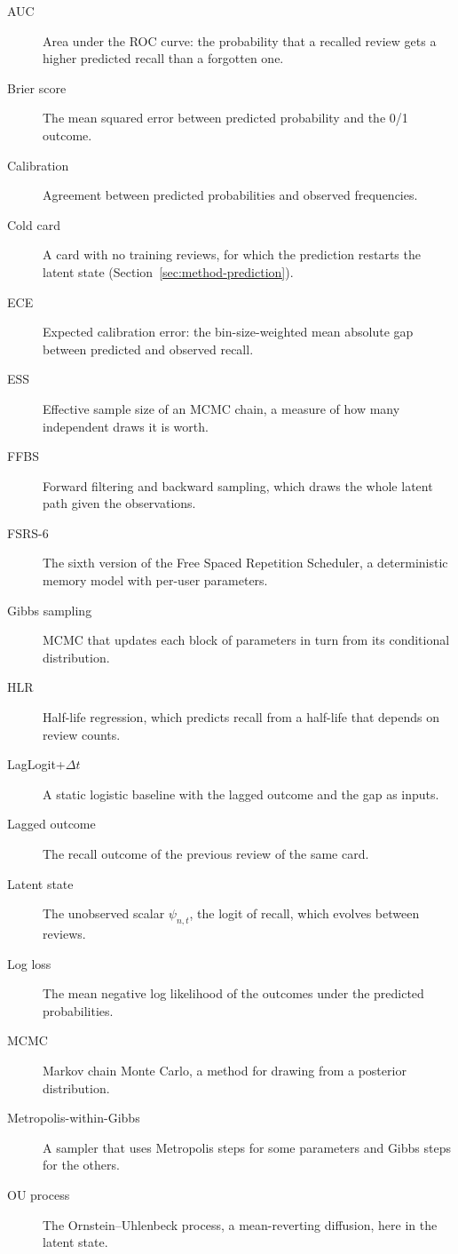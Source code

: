\begin{description}
  \item[AUC] Area under the ROC curve: the probability that a recalled review gets a higher predicted recall than a forgotten one.
  \item[Brier score] The mean squared error between predicted probability and the 0/1 outcome.
  \item[Calibration] Agreement between predicted probabilities and observed frequencies.
  \item[Cold card] A card with no training reviews, for which the prediction restarts the latent state (Section~\ref{sec:method-prediction}).
  \item[ECE] Expected calibration error: the bin-size-weighted mean absolute gap between predicted and observed recall.
  \item[ESS] Effective sample size of an MCMC chain, a measure of how many independent draws it is worth.
  \item[FFBS] Forward filtering and backward sampling, which draws the whole latent path given the observations.
  \item[FSRS-6] The sixth version of the Free Spaced Repetition Scheduler, a deterministic memory model with per-user parameters.
  \item[Gibbs sampling] MCMC that updates each block of parameters in turn from its conditional distribution.
  \item[HLR] Half-life regression, which predicts recall from a half-life that depends on review counts.
  \item[LagLogit+$\Delta t$] A static logistic baseline with the lagged outcome and the gap as inputs.
  \item[Lagged outcome] The recall outcome of the previous review of the same card.
  \item[Latent state] The unobserved scalar $\psi_{n,t}$, the logit of recall, which evolves between reviews.
  \item[Log loss] The mean negative log likelihood of the outcomes under the predicted probabilities.
  \item[MCMC] Markov chain Monte Carlo, a method for drawing from a posterior distribution.
  \item[Metropolis-within-Gibbs] A sampler that uses Metropolis steps for some parameters and Gibbs steps for the others.
  \item[OU process] The Ornstein--Uhlenbeck process, a mean-reverting diffusion, here in the latent state.

\end{description}
